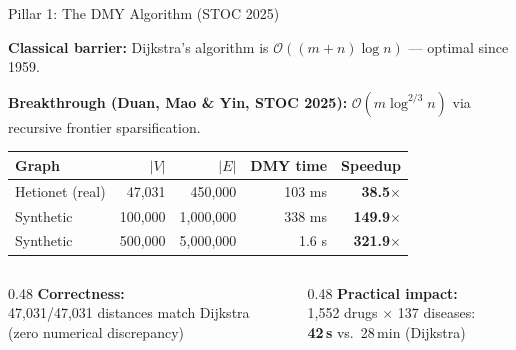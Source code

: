 \documentclass[aspectratio=169,11pt]{beamer}
\newcommand{\BigO}[1]{\mathcal{O}(#1)}
\begin{document}

\begin{frame}{Pillar 1: The DMY Algorithm (STOC 2025)}

\textbf{Classical barrier:} Dijkstra's algorithm is $\BigO{(m+n) \log n}$ --- optimal since 1959.

\vspace{0.3em}

\textbf{Breakthrough (Duan, Mao \& Yin, STOC 2025):}
$\BigO{m \log^{2/3} n}$ via recursive frontier sparsification.

\vspace{0.8em}

\begin{table}
\centering
\begin{tabular}{lrrrr}
\toprule
\textbf{Graph} & \textbf{$|V|$} & \textbf{$|E|$} & \textbf{DMY time} & \textbf{Speedup} \\
\midrule
Hetionet (real) & 47,031 & 450,000 & 103 ms & \textbf{38.5$\times$} \\
Synthetic & 100,000 & 1,000,000 & 338 ms & \textbf{149.9$\times$} \\
Synthetic & 500,000 & 5,000,000 & 1.6 s & \textbf{321.9$\times$} \\
\bottomrule
\end{tabular}
\end{table}

\vspace{0.5em}

\begin{columns}[T]
\begin{column}{0.48\textwidth}
\textbf{Correctness:}\\
47,031/47,031 distances match Dijkstra\\
(zero numerical discrepancy)
\end{column}
\begin{column}{0.48\textwidth}
\textbf{Practical impact:}\\
1,552 drugs $\times$ 137 diseases:\\
\textbf{42\,s} vs.\ 28\,min (Dijkstra)
\end{column}
\end{columns}

\end{frame}

\end{document}

